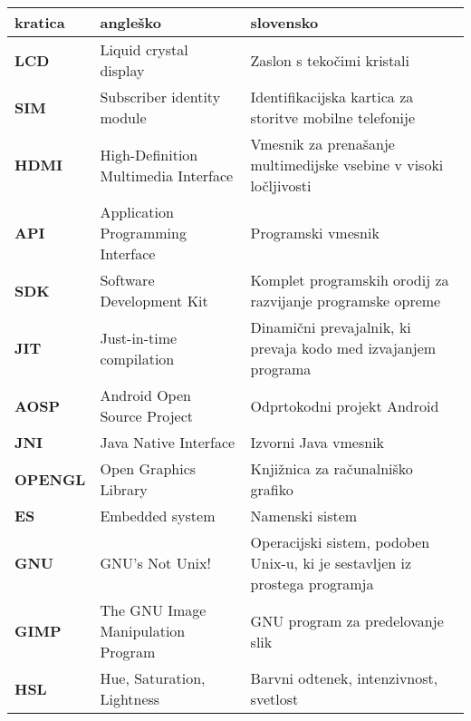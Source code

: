 \begin{tabular}{l|p{5cm}|p{6cm}}
  {\bf kratica} & {\bf angleško} & {\bf slovensko} \\ \hline
  {\bf LCD} & Liquid crystal display & Zaslon s tekočimi kristali \\
  {\bf SIM} & Subscriber identity module & Identifikacijska kartica za storitve mobilne telefonije \\
  {\bf HDMI} & High-Definition Multimedia Interface & Vmesnik za prenašanje multimedijske vsebine v visoki ločljivosti \\
  {\bf API} & Application Programming Interface & Programski vmesnik \\
  {\bf SDK} & Software Development Kit & Komplet programskih orodij za razvijanje programske opreme \\
  {\bf JIT} & Just-in-time compilation & Dinamični prevajalnik, ki prevaja kodo med izvajanjem programa \\
  {\bf AOSP} & Android Open Source Project & Odprtokodni projekt Android \\
  {\bf JNI} & Java Native Interface & Izvorni Java vmesnik \\
  {\bf OPENGL} & Open Graphics Library & Knjižnica za računalniško grafiko \\
  {\bf ES} & Embedded system & Namenski sistem \\
  {\bf GNU} & GNU's Not Unix! & Operacijski sistem, podoben Unix-u, ki je sestavljen iz prostega programja \\
  {\bf GIMP} & The GNU Image Manipulation Program & GNU program za predelovanje slik \\
  {\bf HSL} & Hue, Saturation, Lightness & Barvni odtenek, intenzivnost, svetlost
\end{tabular}
